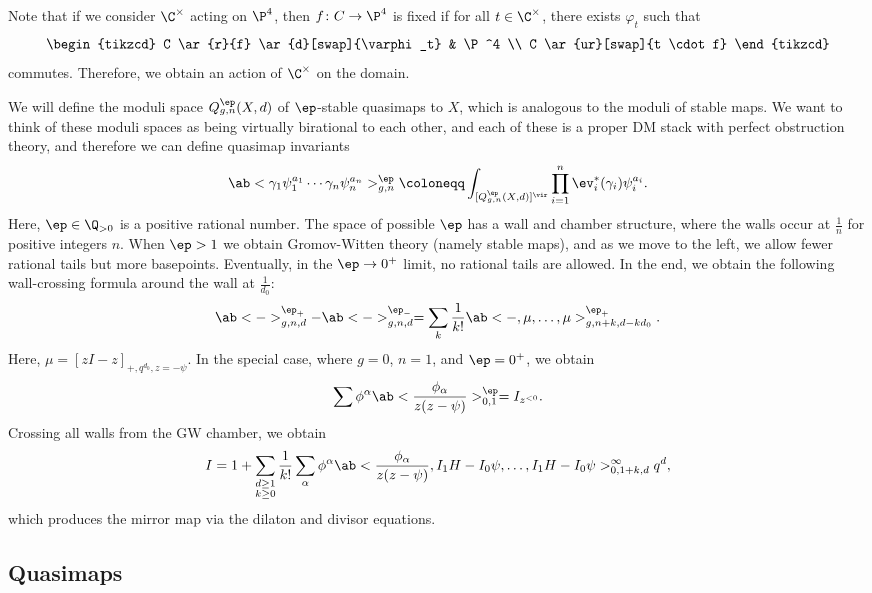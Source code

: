 Note that if we consider \(\C^{\times}\) acting on \(\P^4\), then \(f \colon C \to \P^4\) is fixed if for all \(t \in \C^{\times}\), there exists \(\varphi_t\) such that
\begin{equation*}
\begin{tikzcd}
    C \ar{r}{f} \ar{d}[swap]{\varphi_t} & \P^4 \\
    C \ar{ur}[swap]{t \cdot f}
\end{tikzcd}
\end{equation*}
commutes. Therefore, we obtain an action of \(\C^{\times}\) on the domain.

We will define the moduli space \(Q_{g,n}^{\ep}(X, d)\) of \(\ep\)-stable quasimaps to \(X\), which is analogous to the moduli of stable maps. We want to think of these moduli spaces as being virtually birational to each other, and each of these is a proper DM stack with perfect obstruction theory, and therefore we can define quasimap invariants
\[ \ab< \gamma_1 \psi_1^{a_1} \cdots \gamma_n \psi_n^{a_n}>_{g,n}^{\ep} \coloneqq \int_{[Q_{g,n}^{\ep}(X,d)]^{\vir}} \prod_{i=1}^n \ev_i^*(\gamma_i) \psi_i^{a_i}. \]
Here, \(\ep \in \Q_{>0}\) is a positive rational number. The space of possible \(\ep\) has a wall and chamber structure, where the walls occur at \(\frac{1}{n}\) for positive integers \(n\). When \(\ep > 1\) we obtain Gromov-Witten theory (namely stable maps), and as we move to the left, we allow fewer rational tails but more basepoints. Eventually, in the \(\ep \to 0^+\) limit, no rational tails are allowed. In the end, we obtain the following wall-crossing formula around the wall at \(\frac{1}{d_0}\):
\[ \ab<->_{g,n,d}^{\ep_+} - \ab<->_{g,n,d}^{\ep_-} = \sum_{k} \frac{1}{k!} \ab<-, \mu, \ldots, \mu>_{g,n+k, d-kd_0}^{\ep_+}. \]
Here, \(\mu = [zI-z]_{+, q^{d_0}, z=-\psi}\). In the special case, where \(g = 0\), \(n = 1\), and \(\ep = 0^+\), we obtain
\[ \sum \phi^{\alpha} \ab<\frac{\phi_{\alpha}}{z(z-\psi)}>^{\ep}_{0,1} = I_{z^{<0}}. \]
Crossing all walls from the GW chamber, we obtain
\[ I = 1 + \sum_{\substack{d \geq 1 \\ k \geq 0}} \frac{1}{k!} \sum_{\alpha} \phi^{\alpha} \ab< \frac{\phi_{\alpha}}{z(z-\psi)}, I_1 H - I_0 \psi, \ldots, I_1 H - I_0 \psi>_{0,1+k,d}^{\infty} q^d, \]
which produces the mirror map via the dilaton and divisor equations.

\subsection{Quasimaps}%
\label{sub:Quasimaps}

